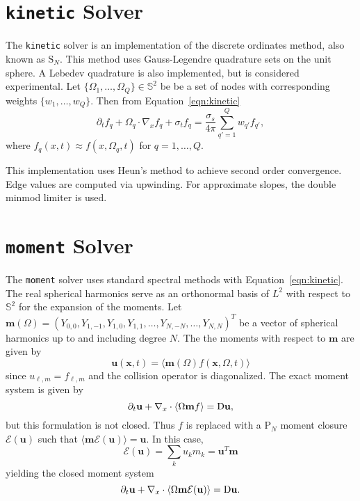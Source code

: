 \documentclass{article}
\newcommand{\integral}[1]{\ensuremath{\langle #1 \rangle}}
\newcommand{\closure}[1]{\ensuremath{\mathcal{E}(#1)}}
\newcommand{\twosphere}{\ensuremath{\mathbb{S}^2}\xspace}
\newcommand{\kinetic}{\texttt{kinetic}\xspace}
\newcommand{\moment}{\texttt{moment}\xspace}
\begin{document}
\section{\kinetic Solver}
The \kinetic solver is an implementation of the discrete ordinates method, also known
as $\mathrm{S}_N$.
This method uses Gauss-Legendre quadrature sets on the unit sphere. A Lebedev
quadrature is also implemented, but is considered experimental. Let
$\{\Omega_1, \dots, \Omega_Q\} \in \twosphere$ be be a set of nodes with
corresponding weights $\{w_1, \dots, w_Q\}$. Then from Equation~\ref{eqn:kinetic}
\begin{equation}
    \partial_t f_q + \Omega_q \cdot \nabla_x f_q + \sigma_t f_q=
    \frac{\sigma_s}{4\pi} \sum_{q'=1}^Q w_{q'} f_{q'},
\end{equation}
where $f_q(x,t) \approx f(x, \Omega_q, t)$ for $q = 1, \dots, Q$.

This implementation uses Heun's method to achieve second order convergence. Edge values
are computed via upwinding. For approximate slopes, the double minmod limiter is used.

\section{\moment Solver}
The \moment solver uses standard spectral methods with Equation~\ref{eqn:kinetic}. The real
spherical harmonics serve as an orthonormal basis of $L^2$ with respect to
\twosphere for the expansion of the moments. Let
$\mathbf{m}(\Omega) =
(Y_{0,0}, Y_{1,-1}, Y_{1,0}, Y_{1,1}, \dots, Y_{N,-N}, \dots, Y_{N,N})^T$
be a vector of spherical harmonics up to and including degree $N$. The the moments
with respect to $\mathbf{m}$ are given by
\begin{equation}
    \mathbf{u}(\mathbf{x}, t) =
    \integral{\mathbf{m}(\Omega) f(\mathbf{x}, \Omega, t)}
\end{equation}
since $u_{\ell,m} = f_{\ell,m}$ and the collision operator is diagonalized.
The exact moment system is given by
\begin{equation}
    \partial_t \mathbf{u} + \nabla_x \cdot \integral{\Omega\mathbf{m}f} =
    \Dif \mathbf{u},
\end{equation}
but this formulation is not closed. Thus $f$ is replaced with a $\mathrm{P}_N$
moment closure $\closure{\mathbf{u}}$ such that
$\integral{\mathbf{m}\closure{\mathbf{u}}} = \mathbf{u}$. In this case,
\begin{equation}
    \closure{\mathbf{u}} = \sum_k u_k m_k = \mathbf{u}^T \mathbf{m}
\end{equation}
yielding the closed moment system
\begin{equation}
    \partial_t \mathbf{u} + \nabla_x \cdot
    \integral{\Omega\mathbf{m}\closure{\mathbf{u}}} = \Dif \mathbf{u}.
\end{equation}
\end{document}
